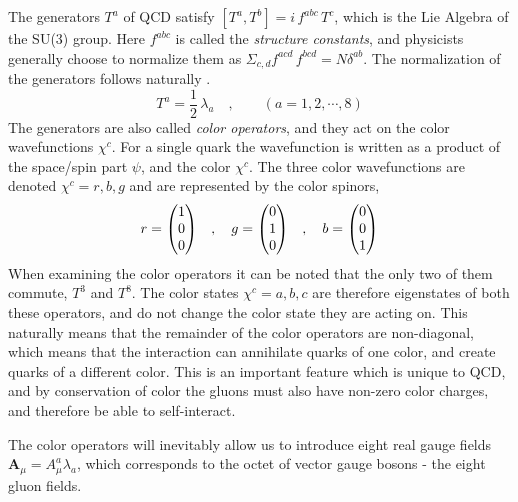 \documentclass[main.tex]{subfiles}
\begin{document}
The generators \(T^a\) of QCD satisfy \(\left[T^a, T^b\right] = i \, f^{abc}\, T^c\), which is the Lie Algebra of the SU(3) group. Here \(f^{abc}\) is called the \emph{structure constants}, and physicists generally choose to normalize them as \(\Sigma_{c,d}f^{acd}\, f^{bcd} = N \delta^{ab}\). The normalization of the generators follows naturally \cite[p.485]{schwartz2014quantum}. 
\begin{equation}\label{eqn: color_operators}
    T^a = \frac{1}{2}\, \lambda_a \quad, \qquad (a=1,2,\cdots, 8)
\end{equation}
The generators are also called \emph{color operators}, and they act on the color wavefunctions \(\chi^c\). For a single quark the wavefunction is written as a product of the space/spin part \(\psi\), and the color \(\chi^c\). The three color wavefunctions are denoted \(\chi^c = r,b,g\) and are represented by the color spinors, 
\begin{equation}\label{eqn: color_spinors}
    r = \mqty(1\\0\\0) \quad, \quad g = \mqty(0\\1\\0) \quad, \quad b = \mqty(0\\0\\1)
\end{equation}
When examining the color operators it can be noted that the only two of them commute, \(T^3\) and \(T^8\). The color states \(\chi^c =a,b,c\) are therefore eigenstates of both these operators, and do not change the color state they are acting on. This naturally means that the remainder of the color operators are non-diagonal, which means that the interaction can annihilate quarks of one color, and create quarks of a different color. This is an important feature which is unique to QCD, and by conservation of color the gluons must also have non-zero color charges, and therefore be able to self-interact.

The color operators will inevitably allow us to introduce eight real gauge fields \(\mathbf{A}_\mu = A_\mu^a \lambda_a\), which corresponds to the octet of vector gauge bosons - the eight gluon fields.
\end{document}

